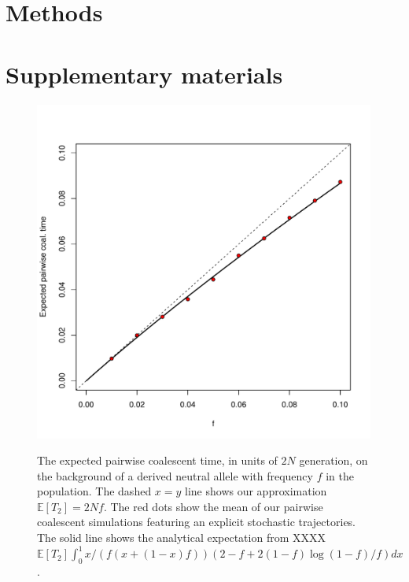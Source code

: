 \documentclass[a4paper,10pt]{article}
\begin{document}
\section{Methods}





\section{Supplementary materials}

\setcounter{table}{0}
\renewcommand{\thetable}{S\arabic{table}}
\setcounter{figure}{0}
\renewcommand{\thefigure}{S\arabic{figure}}


\begin{figure}
	\includegraphics[width = \textwidth]{../Paper_Figures/n_two_coal_time.pdf} \label{n_2_supp_plot}
\caption{The expected pairwise coalescent time, in units of $2N$ generation, on the background of a derived neutral allele with frequency $f$ in the population.  The dashed $x=y$ line shows our approximation $\mathbb{E}  [T_2]=2Nf$. The red dots show the mean of our pairwise coalescent simulations featuring an explicit stochastic trajectories. The solid line shows the analytical expectation from XXXX  
$\mathbb{E} [T_2] \int_0^1 x/(f (x+(1-x)f))(2-f+2(1-f) \log(1-f)/f) dx $.}
\end{figure}   %
\end{document}
